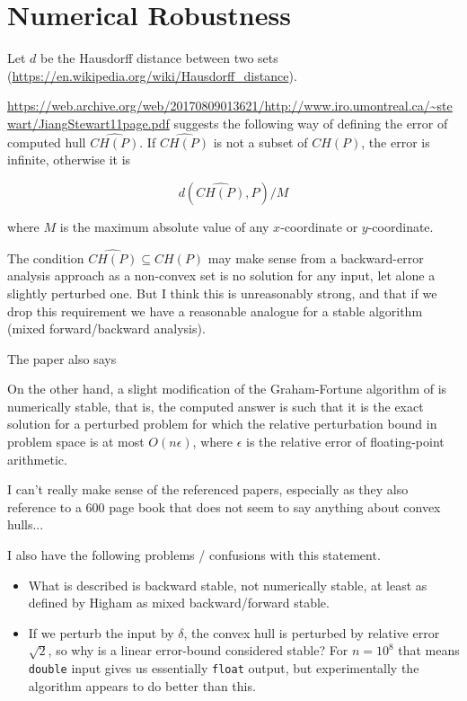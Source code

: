\section{Numerical Robustness}


Let $d$ be the Hausdorff distance between two sets 
(\url{https://en.wikipedia.org/wiki/Hausdorff_distance}).

\url{https://web.archive.org/web/20170809013621/http://www.iro.umontreal.ca/~stewart/JiangStewart11page.pdf} suggests the following way of defining the error of 
computed hull $\widehat{CH(P)}$. If $\widehat{CH(P)}$ is not a subset of $CH(P)$,
the error is infinite, otherwise it is

$$d(\widehat{CH(P)}, P) / M$$

where $M$ is the maximum absolute value of any $x$-coordinate or $y$-coordinate.

The condition $\widehat{CH(P)} \subseteq CH(P)$ may make sense from a 
backward-error analysis approach as a non-convex set is no solution for any
input, let alone a slightly perturbed one. But I think this is unreasonably
strong, and that if we drop this requirement we have a reasonable analogue
for a stable algorithm (mixed forward/backward analysis).

The paper also says

\begin{displayquote}
    On the other hand, a slight modification of the Graham-Fortune algorithm of
    \cite{Fortune89} is numerically stable, that is, the computed answer is 
    such that it is the exact solution for a perturbed problem for which the
    relative perturbation bound in problem space is at most $O(n\epsilon)$,
    where $\epsilon$ is the relative error of floating-point arithmetic.
\end{displayquote}

I can't really make sense of the referenced papers, especially as they also
reference to a 600 page book that does not seem to say anything about convex
hulls...

I also have the following problems / confusions with this statement.

\begin{itemize}
    \item What is described is backward stable, not numerically stable, at
          least as defined by Higham as mixed backward/forward stable.
    \item If we perturb the input by $\delta$, the convex hull is perturbed
          by relative error $\sqrt{2}$, so why is a linear error-bound
          considered stable? 
          For $n = 10^8$ that means \texttt{double} input gives us essentially 
          \texttt{float} output,
          but experimentally the algorithm appears to do better than this.
\end{itemize}

